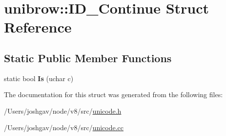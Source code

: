 \hypertarget{structunibrow_1_1_i_d___continue}{}\section{unibrow\+:\+:I\+D\+\_\+\+Continue Struct Reference}
\label{structunibrow_1_1_i_d___continue}
\subsection*{Static Public Member Functions}
\begin{DoxyCompactItemize}
\item 
static bool {\bfseries Is} (uchar c)\hypertarget{structunibrow_1_1_i_d___continue_aa09004a6b7276d233464403cb98e338c}{}\label{structunibrow_1_1_i_d___continue_aa09004a6b7276d233464403cb98e338c}

\end{DoxyCompactItemize}


The documentation for this struct was generated from the following files\+:\begin{DoxyCompactItemize}
\item 
/\+Users/joshgav/node/v8/src/\hyperlink{unicode_8h}{unicode.\+h}\item 
/\+Users/joshgav/node/v8/src/\hyperlink{unicode_8cc}{unicode.\+cc}\end{DoxyCompactItemize}
